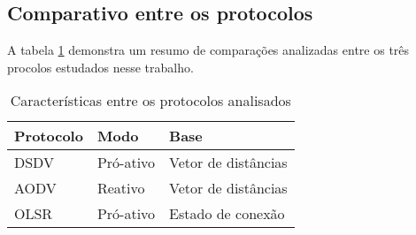 \subsection{Comparativo entre os protocolos} 
A tabela \ref{tabCompProt} demonstra um resumo de compara\c{c}\~oes analizadas entre os tr\^es procolos estudados nesse trabalho.

\begin{table}[H]
	\centering
	\caption{Caracter\'isticas entre os protocolos analisados}
	\begin{tabular}{ | l | l | l | }
		\hline
		Protocolo & Modo & Base \\ \hline
		DSDV & Pr\'o-ativo & Vetor de dist\^ancias \\ \hline
		AODV & Reativo & Vetor de dist\^ancias \\ \hline
		OLSR & Pr\'o-ativo & Estado de conex\~ao \\ \hline
	\end{tabular}
	\label{tabCompProt}
\end{table}